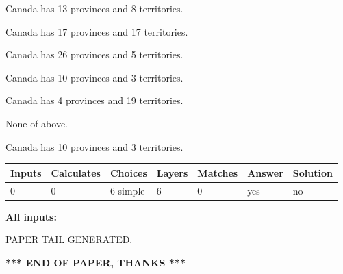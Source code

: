 \documentclass[12pt]{article}
\begin{document}
 
Canada has  13 provinces and  8 territories.
 
 
Canada has  17 provinces and  17 territories.
 
 
Canada has  26 provinces and  5 territories.
 
 
Canada has 10  provinces and 3 territories.
 
 
Canada has   4 provinces and  19 territories.
 
 
 None of above.
 
 
\noindent{}
 
 
Canada has 10  provinces and 3 territories.
 
 
\noindent{}
 
 
   
   
   
   
\noindent\begin{tabular}{|l|l|l|l|l|l|l|}
 \hline
Inputs & Calculates & Choices & Layers & Matches & Answer & Solution \\ \hline
 0  & 
 0  & 
 6
  simple  
  & 
 6  & 
 0  & 
  yes & 
  no 
  \\ \hline
 \end{tabular}
   
   
   
   
\noindent{}
   
   
   
   
\noindent\vspace{0.1in}\hspace{-0.08in} {\textbf{\Large{All inputs: }}}
   
   
   
   
   
   
 \vspace{0.2in}
 
   
   
\vspace{2.0in} PAPER TAIL GENERATED.
   
   
   
   
\vspace{1.0in} 
{\textbf{\large{ *** END OF PAPER, THANKS *** }}} 
   
\end{document}

